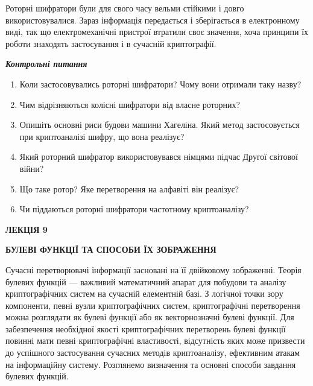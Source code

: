 Роторні шифратори були для свого часу вельми стійкими і довго використовувалися.
Зараз інформація передається і зберігається в електронному виді, так що
електромеханічні пристрої втратили своє значення, хоча принципи їх роботи
знаходять застосування і в сучасній криптографії.


\bigskip

{\centering\bfseries\itshape
Контрольні питання
\par}


\bigskip


\bigskip

\liststyleWWviiiNumxxxiv
\begin{enumerate}
\item Коли застосовувались роторні шифратори? Чому вони отримали таку назву?
\item Чим відрізняються колісні шифратори від власне роторних?
\item Опишіть основні риси будови машини Хагеліна. Який метод застосовується при
криптоаналізі шифру, що вона реалізує?
\item Який роторний шифратор використовувався німцями підчас Другої світової
війни? 
\item Що таке ротор? Яке перетворення на алфавіті він реалізує?
\item Чи піддаються роторні шифратори частотному криптоаналізу?
\end{enumerate}

\bigskip


\bigskip


\bigskip

{\bfseries
 ЛЕКЦІЯ  9}


\bigskip

{\centering\bfseries
БУЛЕВІ  ФУНКЦІЇ  ТА  СПОСОБИ  ЇХ  ЗОБРАЖЕННЯ 
\par}


\bigskip


\bigskip

Сучасні перетворювачі інформації засновані на  її двійковому зображенні. Теорія
булевих функцій --- важливий математичний апарат для побудови та аналізу
криптографічних систем на сучасній елементній базі. З логічної точки зору
компоненти, певні вузли криптографічних систем, криптографічні перетворення
можна розглядати як булеві функції або як векторнозначні булеві функції. Для
забезпечення необхідної якості криптографічних перетворень булеві функції
повинні мати певні криптографічні властивості, відсутність яких може призвести
до успішного застосування сучасних методів криптоаналізу, ефективним атакам на
інформаційну систему. Розглянемо визначення та основні способи завдання булевих
функцій.



